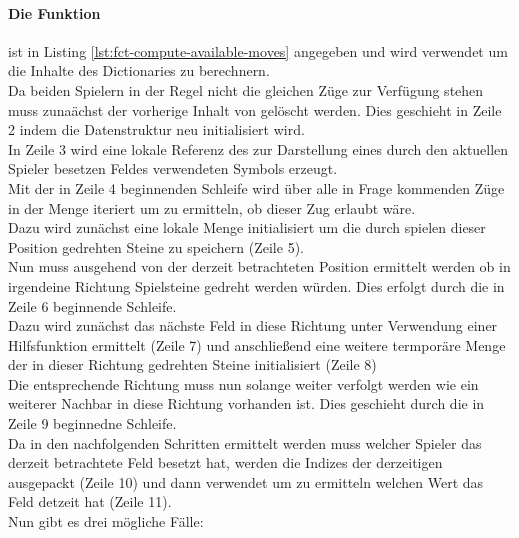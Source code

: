\paragraph{Die Funktion }
 ist in Listing \ref{lst:fct-compute-available-moves} angegeben und wird verwendet um die Inhalte des Dictionaries  zu berechnern.
\\Da beiden Spielern in der Regel nicht die gleichen Züge zur Verfügung stehen muss zunaächst der vorherige Inhalt von  gelöscht werden. Dies geschieht in Zeile 2 indem die Datenstruktur neu initialisiert wird.
\\In Zeile 3 wird eine lokale Referenz des zur Darstellung eines durch den aktuellen Spieler besetzen Feldes verwendeten Symbols erzeugt.
\\Mit der in Zeile 4 beginnenden Schleife wird über alle in Frage kommenden Züge in der Menge  iteriert um zu ermitteln, ob dieser Zug erlaubt wäre.
\\Dazu wird zunächst eine lokale Menge initialisiert um die durch spielen dieser Position gedrehten Steine zu speichern (Zeile 5).
\\Nun muss ausgehend von der derzeit betrachteten Position ermittelt werden ob in irgendeine Richtung Spielsteine gedreht werden würden. Dies erfolgt durch die in Zeile 6 beginnende Schleife.
\\Dazu wird zunächst das nächste Feld in diese Richtung unter Verwendung einer Hilfsfunktion ermittelt (Zeile 7) und anschließend eine weitere termporäre Menge der in dieser Richtung gedrehten Steine initialisiert (Zeile 8)
\\Die entsprechende Richtung muss nun solange weiter verfolgt werden wie ein weiterer Nachbar in diese Richtung vorhanden ist. Dies geschieht durch die in Zeile 9 beginnedne Schleife.
\\Da in den nachfolgenden Schritten ermittelt werden muss welcher Spieler das derzeit betrachtete Feld besetzt hat, werden die Indizes der derzeitigen  ausgepackt (Zeile 10) und dann verwendet um zu ermitteln welchen Wert das Feld detzeit hat (Zeile 11).
\\Nun gibt es drei mögliche Fälle:
